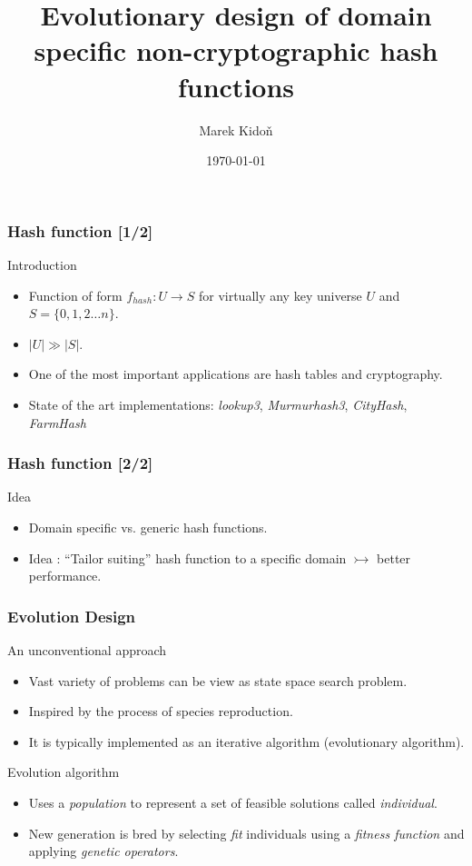 \documentclass[11pt]{beamer}
\author{Marek Kidoň}
\title{Evolutionary design of domain specific non-cryptographic hash functions}
\subtitle{}
\institute{Brno University of Technology}
\date{\today}
\begin{document}
	\begin{frame}[plain]
		\titlepage
		 \addtocounter{framenumber}{-1}
	\end{frame}
	\begin{frame}
		\frametitle{Hash function [1/2]}
		\begin{block}{Introduction} 
		\begin{itemize}[<+->]
			\item Function of form $f_{hash} : U \to S$ for virtually any  key universe $U$ and $S = \{ 0,1,2 \ldots n \}$.
			\item $|U| \gg |S|$.
			\item One of the most important applications are hash tables and cryptography.
			\item State of the art implementations: \textit{lookup3}, \textit{Murmurhash3}, \textit{CityHash}, \textit{FarmHash}
		\end{itemize}
		\end{block}
	\end{frame}
	
	\begin{frame}
		\frametitle{Hash function [2/2]}
		\begin{block}{Idea} 
			\begin{itemize}[<+->]
				\item Domain specific vs. generic hash functions. \\
				\item Idea : ``Tailor suiting'' hash function to a specific domain $\rightarrowtail$ better performance. 
			\end{itemize}
		\end{block}
	\end{frame}
	
	\begin{frame}
		\frametitle{Evolution Design}
		\begin{block}{An unconventional approach}
			\begin{itemize}[<+->]
				\item Vast variety of problems can be view as state space search problem.
				\item Inspired by the process of species reproduction.
				\item It is typically implemented as an iterative algorithm (evolutionary algorithm).
			\end{itemize}
		\end{block}
		\begin{block}{Evolution algorithm}
			\begin{itemize}[<+->]
				\item Uses a \textit{population} to represent a set of feasible solutions called \textit{individual}.
				\item New generation is bred by selecting \textit{fit} individuals using a \textit{fitness function} 
					and applying \textit{genetic operators}.
			\end{itemize}  
		\end{block}
	\end{frame}
	
\end{document}
